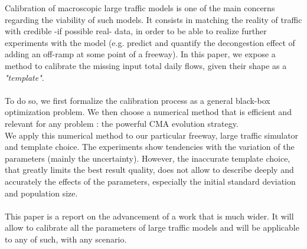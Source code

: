 Calibration of macroscopic large traffic models is one of the main concerns regarding the viability of such models. It consists in matching the reality of traffic with credible -if possible real- data, in order to be able to realize further experiments with the model (e.g. predict and quantify the decongestion effect of adding an off-ramp at some point of a freeway). In this paper, we expose a method to calibrate the missing input total daily flows, given their shape as a \emph{"template"}.\\
\\
To do so, we first formalize the calibration process as a general black-box optimization problem. We then choose a numerical method that is efficient and relevant for any problem : the powerful CMA evolution strategy.\\
We apply this numerical method to our particular freeway, large traffic simulator and template choice. The experiments show tendencies with the variation of the parameters (mainly the uncertainty). However, the inaccurate template choice, that greatly limits the best result quality, does not allow to describe deeply and accurately the effects of the parameters, especially the initial standard deviation and population size. \\
\\
This paper is a report on the advancement of a work that is much wider. It will allow to calibrate all the parameters of large traffic models and will be applicable to any of such, with any scenario.